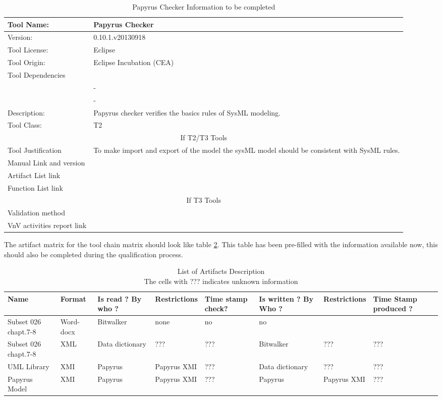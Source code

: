 \begin{table}[htbp]
\centering
\caption{\label{tbl:papyrusCheck-info} Papyrus Checker Information to be completed}
\begin{tabular}{|l|p{5cm}|}\hline
Tool Name: & Papyrus Checker \\\hline
Version: &  0.10.1.v20130918 \\\hline
Tool License: & Eclipse \\\hline
Tool Origin: &  Eclipse Incubation (CEA)\\\hline
Tool Dependencies & \\
 & -\\
 & -\\ \hline
Description: & Papyrus checker verifies the basics rules of SysML modeling. \\ \hline
Tool Class: & T2\\\hline
\multicolumn{2}{|c|}{If T2/T3 Tools}\\\hline
Tool Justification & To make import and export of the model the sysML
model should be consistent with SysML rules.\\ \hline
Manual Link and version & \\\hline
Artifact List link & \\\hline
Function List link& \\\hline
\multicolumn{2}{|c|}{If T3 Tools}\\\hline
Validation method& \\\hline
VnV activities report link&\\\hline
\end{tabular}
\end{table}

The artifact matrix for the tool chain matrix should look like
table \ref{tbl:example-artifacts}.
This table has been pre-filled with the information available now,
this should also be completed during the qualification process.

\begin{table}[htbp]
\caption{\label{tbl:example-artifacts} List of  Artifacts Description\\ The
cells with ??? indicates unknown information\\ }
{\small
\begin{tabular}{|p{4em}|l|p{1.5cm}|l|p{5em}|p{1.8cm}|l|p{5em}|}\hline
Name & Format & Is read ? By who ?& Restrictions & Time stamp check? &Is
written ? By Who ?& Restrictions & Time Stamp produced ?\\\hline
Subset 026 chapt.7-8 & Word-docx & Bitwalker & none & no & no &
&\\\hline
Subset 026 chapt.7-8 & XML  & 
Data dictionary &  ??? & ??? & Bitwalker & ??? & ??? \\\hline
UML Library & XMI & Papyrus & Papyrus XMI & ??? & Data dictionary &
??? & ??? \\\hline 
Papyrus Model & XMI & Papyrus & Papyrus XMI & ??? & Papyrus &
 Papyrus XMI & ??? \\\hline 

\end{tabular}

}
\end{table}

